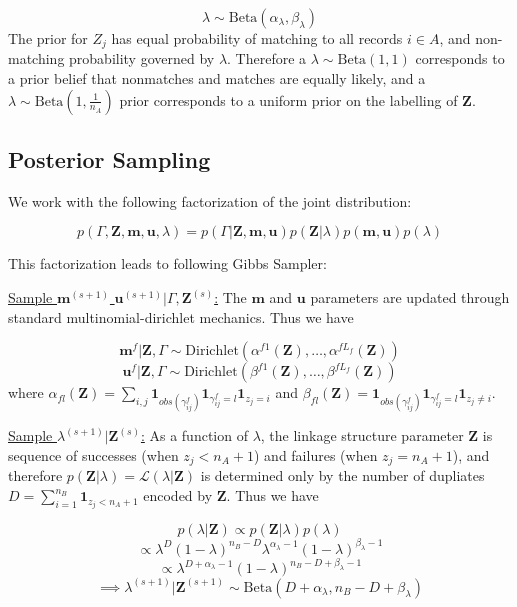 \documentclass[
  12pt,
]{article}
\begin{document}
\[\lambda \sim \text{Beta}(\alpha_{\lambda}, \beta_{\lambda}) \] The
prior for \(Z_j\) has equal probability of matching to all records
\(i\in A\), and non-matching probability governed by \(\lambda\).
Therefore a \(\lambda \sim \text{Beta}(1, 1)\) corresponds to a prior
belief that nonmatches and matches are equally likely, and a
\(\lambda \sim \text{Beta}(1, \frac{1}{n_A})\) prior corresponds to a
uniform prior on the labelling of \(\mathbf{Z}\).

\hypertarget{posterior-sampling}{%
\subsection{Posterior Sampling}\label{posterior-sampling}}

We work with the following factorization of the joint distribution:

\[p(\Gamma, \mathbf{Z}, \mathbf{m}, \mathbf{u}, \lambda) = p(\Gamma|\mathbf{Z}, \mathbf{m}, \mathbf{u}) p(\mathbf{Z} | \lambda) p(\mathbf{m}, \mathbf{u}) p(\lambda)\]

This factorization leads to following Gibbs Sampler:

\underline{Sample $\mathbf{m}^{(s+1)}$ $\mathbf{u}^{(s+1)}|\Gamma, \mathbf{Z}^{(s)}$:}
The \(\mathbf{m}\) and \(\mathbf{u}\) parameters are updated through
standard multinomial-dirichlet mechanics. Thus we have

\[\mathbf{m}^f|\mathbf{Z}, \Gamma \sim \text{Dirichlet}(\alpha^{f1}(\mathbf{Z}), \ldots, \alpha^{fL_f}(\mathbf{Z}))\]
\[\mathbf{u}^f|\mathbf{Z}, \Gamma \sim \text{Dirichlet}(\beta^{f1}(\mathbf{Z}), \ldots, \beta^{fL_f}(\mathbf{Z}))\]
where
\(\alpha_{fl}(\mathbf{Z})= \sum_{i,j} \mathbf{1}_{obs(\gamma_{ij}^f)}\mathbf{1}_{\gamma_{ij}^f = l} \mathbf{1}_{z_j = i}\)
and
\(\beta_{fl}(\mathbf{Z})= \mathbf{1}_{obs(\gamma_{ij}^f)}\mathbf{1}_{\gamma_{ij}^f = l} \mathbf{1}_{z_j \neq i}\).

\underline{Sample $\lambda^{(s+1)}|\mathbf{Z}^{(s)}$:} As a function of
\(\lambda\), the linkage structure parameter \(\mathbf{Z}\) is sequence
of successes (when \(z_j < n_A + 1\)) and failures (when
\(z_j = n_A + 1\)), and therefore
\(p(\mathbf{Z}|\lambda) = \mathcal{L}(\lambda|\mathbf{Z})\) is
determined only by the number of dupliates
\(D = \sum_{i=1}^{n_B}\mathbf{1}_{z_j < n_A + 1}\) encoded by
\(\mathbf{Z}\). Thus we have

\[p(\lambda | \mathbf{Z}) \propto p(\mathbf{Z}|\lambda)p(\lambda)\]
\[\propto \lambda^D (1-\lambda)^{n_B - D} \lambda^{\alpha_{\lambda} -1} (1-\lambda)^{\beta_{\lambda} -1}\]
\[ \propto \lambda^{D + \alpha_{\lambda} - 1} (1-\lambda)^{n_B - D + \beta_{\lambda} -1}\]
\[\implies \lambda^{(s+1)}|\mathbf{Z}^{(s+1)} \sim \text{Beta}(D + \alpha_{\lambda}, n_B - D + \beta_{\lambda})\]
\end{document}
